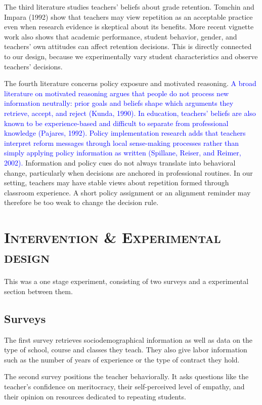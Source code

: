 \documentclass[12pt,a4paper]{article}
\begin{document}
The third literature studies teachers' beliefs about grade retention. Tomchin and Impara (1992) show that teachers may view repetition as an acceptable practice even when research evidence is skeptical about its benefits. More recent vignette work also shows that academic performance, student behavior, gender, and teachers' own attitudes can affect retention decisions. This is directly connected to our design, because we experimentally vary student characteristics and observe teachers' decisions.

The fourth literature concerns policy exposure and motivated reasoning. \textcolor{blue}{A broad literature on motivated reasoning argues that people do not process new information neutrally: prior goals and beliefs shape which arguments they retrieve, accept, and reject (Kunda, 1990). In education, teachers' beliefs are also known to be experience-based and difficult to separate from professional knowledge (Pajares, 1992). Policy implementation research adds that teachers interpret reform messages through local sense-making processes rather than simply applying policy information as written (Spillane, Reiser, and Reimer, 2002).} Information and policy cues do not always translate into behavioral change, particularly when decisions are anchored in professional routines. In our setting, teachers may have stable views about repetition formed through classroom experience. A short policy assignment or an alignment reminder may therefore be too weak to change the decision rule.


\section{\textsc{Intervention \& Experimental design}}

This was a one stage experiment, consisting of two surveys and a experimental section between them. 

\subsection{Surveys}

The first survey retrieves sociodemographical information as well as data on the type of school, course and classes they teach. They also give labor information such as the number of years of experience or the type of contract they hold. 

The second survey positions the teacher behaviorally. It asks questions like the teacher's confidence on meritocracy, their self-perceived level of empathy, and their opinion on resources dedicated to repeating students.
\end{document}
